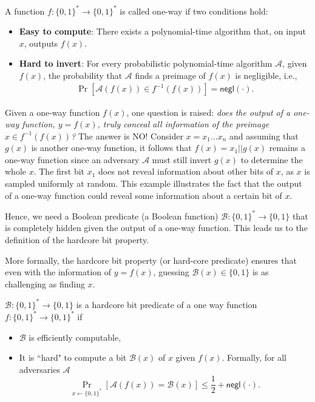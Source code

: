 \documentclass[cryptography,review,submit,pdftex,moreauthors,amsmath,amssymb,aps,strict]{Definitions/mdpi}
\begin{document}
\begin{Definition}
    A function $f:\{0,1\}^* \to \{0,1\}^*$ is called one-way if two conditions hold:
    \begin{itemize}
        \item \textbf{Easy to compute}: There exists a polynomial-time algorithm that, on input $x$, outputs $f(x)$.
        \item \textbf{Hard to invert}: For every probabilistic polynomial-time algorithm $\mathcal{A}$, given $f(x)$, the probability that $\mathcal{A}$ finds a preimage of $f(x)$ is negligible, i.e.,
        \begin{align}
            \Pr[\mathcal{A}(f(x)) \in f^{-1}(f(x))] = \mathsf{negl}(\cdot).
        \end{align}
    \end{itemize}
\end{Definition}

\noindent Given a one-way function $f(x)$, one question is raised: \textit{does the output of a one-way function, $y=f(x)$, truly conceal all information of the preimage $x\in f^{-1}(f(x))$?} The answer is NO! 
Consider $x=x_1\dots x_n$ and assuming that $g(x)$ is another one-way function, it follows that $f(x) = x_1||g(x)$ remains a one-way function since an adversary $\mathcal{A}$ must still invert $g(x)$ to determine the whole $x$. The first bit $x_1$ does not reveal information about other bits of $x$, as $x$ is sampled uniformly at random. This example illustrates the fact that the output of a one-way function could reveal some information about a certain bit of $x$.

Hence, we need a Boolean predicate (a Boolean function) $\mathcal{B}:\{0,1\}^*\to\{0,1\}$ that is completely hidden given the output of a one-way function. This leads us to the definition of the hardcore bit property.

\noindent More formally, the hardcore bit property (or hard-core predicate) ensures that even with the information of $y=f(x)$, guessing $\mathcal{B}(x)\in\{0,1\}$ is as challenging as finding $x$. 

\begin{Definition}
    $\mathcal{B}:\{0,1\}^*\to\{0,1\}$ is a hardcore bit predicate of a one way function $f:\{0,1\}^*\to\{0,1\}^*$ if
    \begin{itemize}
        \item $\mathcal{B}$ is efficiently computable,
        \item It is “hard" to compute a bit $\mathcal{B}(x)$ of $x$ given $f(x)$. Formally, for all adversaries $\mathcal{A}$
        $$\Pr_{x\gets\{0,1\}^*}[\mathcal{A}(f(x))=\mathcal{B}(x)]\leq \displaystyle\frac{1}{2}+\mathsf{negl}(\cdot).$$
    \end{itemize}
\end{Definition}
\end{document}
